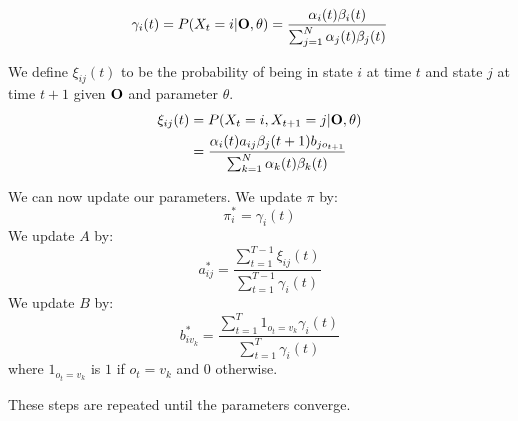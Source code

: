 $$\gamma_i(t) = P(X_t = i | \bold{O}, \theta) = \frac{\alpha_i(t) \beta_i(t)}{\sum_{j=1}^N \alpha_j(t) \beta_j(t)}$$

We define $\xi_{ij}(t)$ to be the probability of being in state $i$ at time $t$ and state $j$ at time $t+1$ given $\bold{O}$ and parameter $\theta$. 
$$
\begin{aligned}
\xi_{ij}(t) &= P(X_t = i, X_{t+1} = j | \bold{O}, \theta)  \\
&=\frac{\alpha_i(t) a_{ij} \beta_j(t+1)b_{jo_{t+1}}}{\sum_{k=1}^N \alpha_k(t) \beta_k(t)}
\end{aligned}
$$ 

We can now update our parameters. We update $\pi$ by:
$$\pi_i^* = \gamma_i(t)$$
We update $A$ by:
$$a^*_{ij} = \frac{\sum_{t=1}^{T-1}\xi_{ij}(t)}{\sum_{t=1}^{T-1}\gamma_i(t)}$$
We update $B$ by:
$$b^*_{iv_k} = \frac{\sum_{t=1}^{T}1_{o_t = v_k} \gamma_i(t)}{\sum_{t=1}^T \gamma_i(t)}$$ 
where $1_{o_t = v_k}$ is $1$ if $o_t = v_k$ and $0$ otherwise. 

These steps are repeated until the parameters converge. 
